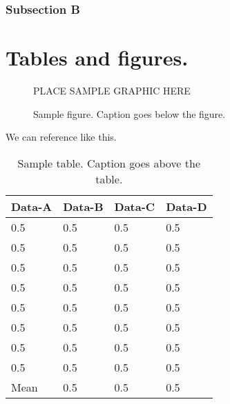 \documentclass[master]{thesis}
\begin{document}
\subsection{Subsection B}

\chapter{Tables and figures.}
\label{chap:tables.and.figs}

\begin{figure}[hp] %
    PLACE SAMPLE GRAPHIC HERE
    \caption{Sample figure.  Caption goes below the figure.}
    \label{fig:sample}
\end{figure}

We can reference  like this.

\begin{table*}[hp]
    \caption{Sample table.  Caption goes above the table.}
    \label{table:sample}
    \begin{center}
        \begin{tabular}{@{}*{4}{l}} %
            \toprule
            Data-A  & Data-B    & Data-C    & Data-D \\
            \midrule
            0.5     & 0.5       & 0.5       & 0.5   \\
            0.5     & 0.5       & 0.5       & 0.5   \\
            0.5     & 0.5       & 0.5       & 0.5   \\
            0.5     & 0.5       & 0.5       & 0.5   \\
            0.5     & 0.5       & 0.5       & 0.5   \\
            0.5     & 0.5       & 0.5       & 0.5   \\
            0.5     & 0.5       & 0.5       & 0.5   \\
            0.5     & 0.5       & 0.5       & 0.5   \\
            \midrule
            Mean    & 0.5       & 0.5       & 0.5   \\
            \bottomrule
        \end{tabular}
    \end{center}
\end{table*}
\end{document}
